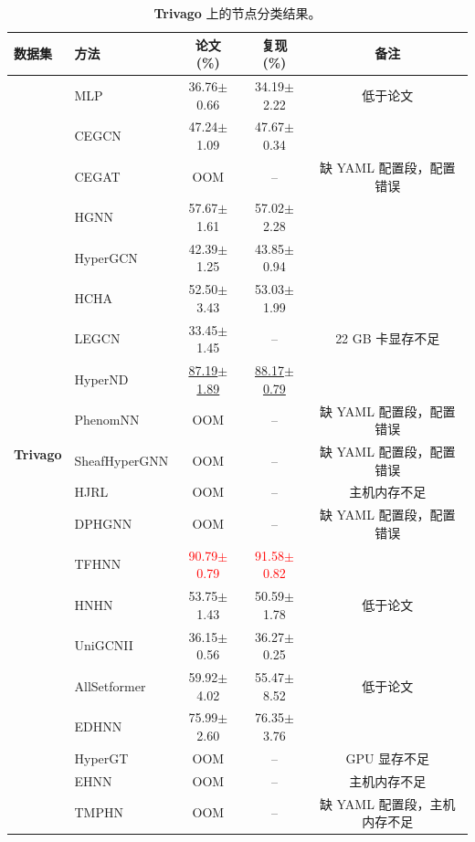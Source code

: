 \documentclass[11pt,a4paper]{article}
\begin{document}
\begin{table}[H]
	\centering\small
	\begin{tabular}{llccc}
		\toprule
		数据集 & 方法 & 论文 (\%) & 复现 (\%) & 备注 \\
		\midrule
		\multirow{20}{*}{\textbf{Trivago}} & MLP               & 36.76$\pm$0.66   & 34.19$\pm$2.22   & 低于论文 \\
		 & CEGCN             & 47.24$\pm$1.09   & 47.67$\pm$0.34   &  \\
		 & CEGAT             & OOM              & --               & 缺 YAML 配置段，配置错误 \\
		 & HGNN              & 57.67$\pm$1.61   & 57.02$\pm$2.28   &  \\
		 & HyperGCN          & 42.39$\pm$1.25   & 43.85$\pm$0.94   &  \\
		 & HCHA              & 52.50$\pm$3.43   & 53.03$\pm$1.99   &  \\
		 & LEGCN             & 33.45$\pm$1.45   & --               & 22 GB 卡显存不足 \\
		 & HyperND           & \underline{87.19$\pm$1.89}   & \underline{88.17$\pm$0.79}   &  \\
		 & PhenomNN          & OOM              & --               & 缺 YAML 配置段，配置错误 \\
		 & SheafHyperGNN     & OOM              & --               & 缺 YAML 配置段，配置错误 \\
		 & HJRL              & OOM              & --               & 主机内存不足 \\
		 & DPHGNN            & OOM              & --               & 缺 YAML 配置段，配置错误 \\
		 & TFHNN             & \textcolor{red}{90.79$\pm$0.79}   & \textcolor{red}{91.58$\pm$0.82}   &  \\
		 & HNHN              & 53.75$\pm$1.43   & 50.59$\pm$1.78   & 低于论文 \\
		 & UniGCNII          & 36.15$\pm$0.56   & 36.27$\pm$0.25   &  \\
		 & AllSetformer      & 59.92$\pm$4.02   & 55.47$\pm$8.52   & 低于论文 \\
		 & EDHNN             & 75.99$\pm$2.60   & 76.35$\pm$3.76   &  \\
		 & HyperGT           & OOM              & --               & GPU 显存不足 \\
		 & EHNN              & OOM              & --               & 主机内存不足 \\
		 & TMPHN             & OOM              & --               & 缺 YAML 配置段，主机内存不足 \\
		\bottomrule
	\end{tabular}
	\caption{\textbf{Trivago} 上的节点分类结果。}
\end{table}
\end{document}
